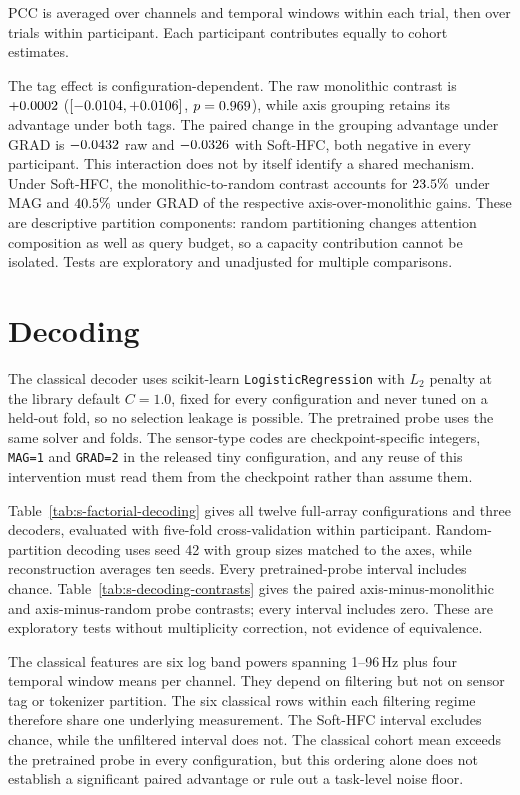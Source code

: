 \documentclass[letterpaper]{article}
\begin{document}
PCC is averaged over channels and temporal windows within each trial, then over trials within participant. Each participant contributes equally to cohort estimates.

The tag effect is configuration-dependent. The raw monolithic contrast is $+0.0002$ ($[-0.0104, +0.0106]$, $p=0.969$), while axis grouping retains its advantage under both tags. The paired change in the grouping advantage under GRAD is $-0.0432$ raw and $-0.0326$ with Soft-HFC, both negative in every participant. This interaction does not by itself identify a shared mechanism. Under Soft-HFC, the monolithic-to-random contrast accounts for $23.5\%$ under MAG and $40.5\%$ under GRAD of the respective axis-over-monolithic gains. These are descriptive partition components: random partitioning changes attention composition as well as query budget, so a capacity contribution cannot be isolated. Tests are exploratory and unadjusted for multiple comparisons.

\section{Decoding}
The classical decoder uses scikit-learn \texttt{LogisticRegression} with $L_2$ penalty at the library default $C=1.0$, fixed for every configuration and never tuned on a held-out fold, so no selection leakage is possible. The pretrained probe uses the same solver and folds. The sensor-type codes are checkpoint-specific integers, \texttt{MAG=1} and \texttt{GRAD=2} in the released tiny configuration, and any reuse of this intervention must read them from the checkpoint rather than assume them.


Table~\ref{tab:s-factorial-decoding} gives all twelve full-array configurations and three decoders, evaluated with five-fold cross-validation within participant. Random-partition decoding uses seed 42 with group sizes matched to the axes, while reconstruction averages ten seeds. Every pretrained-probe interval includes chance. Table~\ref{tab:s-decoding-contrasts} gives the paired axis-minus-monolithic and axis-minus-random probe contrasts; every interval includes zero. These are exploratory tests without multiplicity correction, not evidence of equivalence.

The classical features are six log band powers spanning 1--96\,Hz plus four temporal window means per channel. They depend on filtering but not on sensor tag or tokenizer partition. The six classical rows within each filtering regime therefore share one underlying measurement. The Soft-HFC interval excludes chance, while the unfiltered interval does not. The classical cohort mean exceeds the pretrained probe in every configuration, but this ordering alone does not establish a significant paired advantage or rule out a task-level noise floor.
\end{document}
